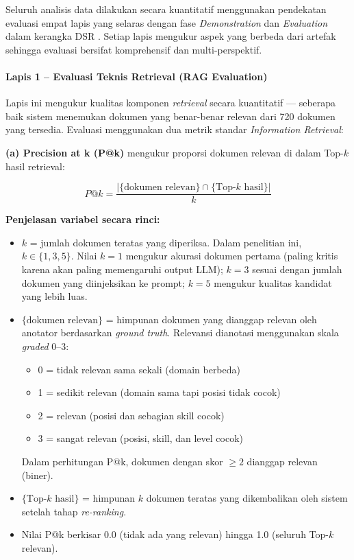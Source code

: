 Seluruh analisis data dilakukan secara kuantitatif menggunakan pendekatan evaluasi
empat lapis yang selaras dengan fase \textit{Demonstration} dan \textit{Evaluation} dalam
kerangka DSR \cite{Peffers2007}. Setiap lapis mengukur aspek yang berbeda dari artefak
sehingga evaluasi bersifat komprehensif dan multi-perspektif.

\paragraph{Lapis 1 -- Evaluasi Teknis Retrieval (RAG Evaluation)}
Lapis ini mengukur kualitas komponen \textit{retrieval} secara kuantitatif ---
seberapa baik sistem menemukan dokumen yang benar-benar relevan dari 720 dokumen
yang tersedia. Evaluasi menggunakan dua metrik standar \textit{Information Retrieval}:

\textbf{(a) Precision at k (P@k)} mengukur proporsi dokumen relevan di dalam Top-$k$
hasil retrieval:

\begin{equation}
  P@k = \frac{|\{\text{dokumen relevan}\} \cap \{\text{Top-}k \text{ hasil}\}|}{k}
  \label{eq:precision_at_k}
\end{equation}

\noindent \textbf{Penjelasan variabel secara rinci:}
\begin{itemize}
  \item $k$ = jumlah dokumen teratas yang diperiksa. Dalam penelitian ini,
    $k \in \{1, 3, 5\}$. Nilai $k=1$ mengukur akurasi dokumen pertama (paling kritis
    karena akan paling memengaruhi output LLM); $k=3$ sesuai dengan jumlah dokumen
    yang diinjeksikan ke prompt; $k=5$ mengukur kualitas kandidat yang lebih luas.
  \item $\{\text{dokumen relevan}\}$ = himpunan dokumen yang dianggap relevan oleh
    anotator berdasarkan \textit{ground truth}. Relevansi dianotasi menggunakan
    skala \textit{graded} 0--3:
    \begin{itemize}[noitemsep]
      \item 0 = tidak relevan sama sekali (domain berbeda)
      \item 1 = sedikit relevan (domain sama tapi posisi tidak cocok)
      \item 2 = relevan (posisi dan sebagian skill cocok)
      \item 3 = sangat relevan (posisi, skill, dan level cocok)
    \end{itemize}
    Dalam perhitungan P@k, dokumen dengan skor $\geq 2$ dianggap relevan (biner).
  \item $\{\text{Top-}k \text{ hasil}\}$ = himpunan $k$ dokumen teratas yang
    dikembalikan oleh sistem setelah tahap \textit{re-ranking}.
  \item Nilai P@k berkisar 0.0 (tidak ada yang relevan) hingga 1.0
    (seluruh Top-$k$ relevan).
\end{itemize}

